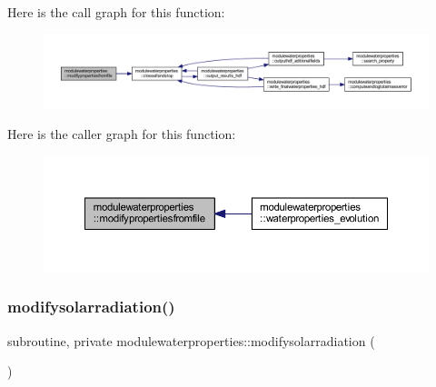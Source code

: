 Here is the call graph for this function\+:\nopagebreak
\begin{figure}[H]
\begin{center}
\leavevmode
\includegraphics[width=350pt]{namespacemodulewaterproperties_a0b4d4f88a02be98e446a383c70ac8803_cgraph}
\end{center}
\end{figure}
Here is the caller graph for this function\+:\nopagebreak
\begin{figure}[H]
\begin{center}
\leavevmode
\includegraphics[width=350pt]{namespacemodulewaterproperties_a0b4d4f88a02be98e446a383c70ac8803_icgraph}
\end{center}
\end{figure}
\mbox{\label{namespacemodulewaterproperties_a53a84226a2a46ab704fec5883bc4639a}} 
\subsubsection{\texorpdfstring{modifysolarradiation()}{modifysolarradiation()}}
{\footnotesize\ttfamily subroutine, private modulewaterproperties\+::modifysolarradiation (\begin{DoxyParamCaption}{ }\end{DoxyParamCaption})\hspace{0.3cm}{\ttfamily [private]}}

